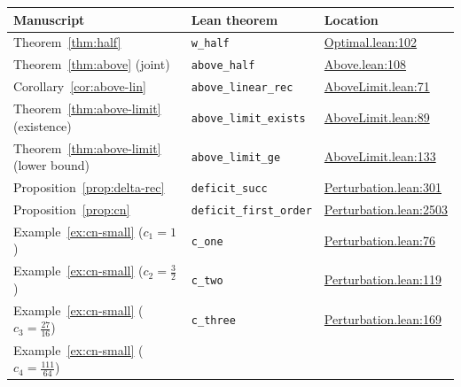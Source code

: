 \documentclass[12pt]{article}
\theoremstyle{definition}
\theoremstyle{remark}
\begin{document}
\renewcommand{\arraystretch}{1.15}
\begin{table}[h]
\centering
\begin{tabular}{@{}lll@{}}
\hline
\textbf{Manuscript} & \textbf{Lean theorem} & \textbf{Location} \\
\hline
Theorem~\ref{thm:half} &
  \texttt{w\_half} &
  \href{https://github.com/pfaffelh/coins/blob/c60bcd3/CoinsLean/CoinsLean/Optimal.lean\#L102}{Optimal.lean:102} \\
Theorem~\ref{thm:above} (joint) &
  \texttt{above\_half} &
  \href{https://github.com/pfaffelh/coins/blob/c60bcd3/CoinsLean/CoinsLean/Above.lean\#L108}{Above.lean:108} \\
Corollary~\ref{cor:above-lin} &
  \texttt{above\_linear\_rec} &
  \href{https://github.com/pfaffelh/coins/blob/c60bcd3/CoinsLean/CoinsLean/AboveLimit.lean\#L71}{AboveLimit.lean:71} \\
Theorem~\ref{thm:above-limit} (existence) &
  \texttt{above\_limit\_exists} &
  \href{https://github.com/pfaffelh/coins/blob/c60bcd3/CoinsLean/CoinsLean/AboveLimit.lean\#L89}{AboveLimit.lean:89} \\
Theorem~\ref{thm:above-limit} (lower bound) &
  \texttt{above\_limit\_ge} &
  \href{https://github.com/pfaffelh/coins/blob/c60bcd3/CoinsLean/CoinsLean/AboveLimit.lean\#L133}{AboveLimit.lean:133} \\
Proposition~\ref{prop:delta-rec} &
  \texttt{deficit\_succ} &
  \href{https://github.com/pfaffelh/coins/blob/c60bcd3/CoinsLean/CoinsLean/Perturbation.lean\#L301}{Perturbation.lean:301} \\
Proposition~\ref{prop:cn} &
  \texttt{deficit\_first\_order} &
  \href{https://github.com/pfaffelh/coins/blob/c60bcd3/CoinsLean/CoinsLean/Perturbation.lean\#L2503}{Perturbation.lean:2503} \\
Example~\ref{ex:cn-small} ($c_1=1$) &
  \texttt{c\_one} &
  \href{https://github.com/pfaffelh/coins/blob/c60bcd3/CoinsLean/CoinsLean/Perturbation.lean\#L76}{Perturbation.lean:76} \\
Example~\ref{ex:cn-small} ($c_2=\tfrac{3}{2}$) &
  \texttt{c\_two} &
  \href{https://github.com/pfaffelh/coins/blob/c60bcd3/CoinsLean/CoinsLean/Perturbation.lean\#L119}{Perturbation.lean:119} \\
Example~\ref{ex:cn-small} ($c_3=\tfrac{27}{16}$) &
  \texttt{c\_three} &
  \href{https://github.com/pfaffelh/coins/blob/c60bcd3/CoinsLean/CoinsLean/Perturbation.lean\#L169}{Perturbation.lean:169} \\
Example~\ref{ex:cn-small} ($c_4=\tfrac{111}{64}$) &

\end{tabular}
\end{table}
\end{document}
